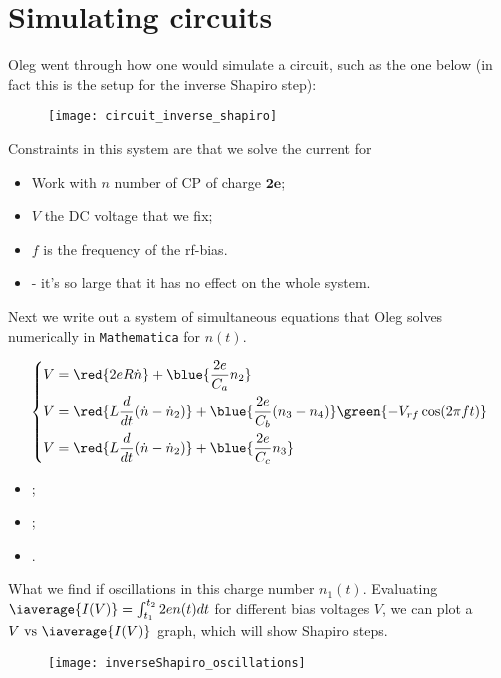 \newpage
\section{Simulating circuits \label{sec:simulating_circuits}}
Oleg went  through how one  would simulate a  circuit, such as  the one
below (in fact this is the setup for the inverse Shapiro step):

\begin{figure}[h]
  \centering \texttt{[image: circuit\_inverse\_shapiro]}
\end{figure}

\noindent

\noindent Constraints in this system are that we solve the current for
\begin{itemize}
\item Work with $ n $ \hfill number of CP of charge $ \mathbf{2e} $;
\item $ V $ \hfill the DC voltage that we fix;
\item $f$ \hfill is the frequency of the rf-bias.
\item {} - it's so large that it
  has no effect on the whole system.
\end{itemize}

\noindent Next  we write  out a system  of simultaneous  equations that
Oleg solves numerically in \verb|Mathematica| for $ n(t) $.

 \begin{equation}\label{key}
   \left\lbrace\begin{aligned}
       V & = \red{2eR\dot{n}} + \blue{\frac{2e}{C_a}n_2}\\
       V & = \red{L\frac{d}{dt}(\dot{n}-\dot{n}_2)} + \blue{\frac{2e}{C_b}(n_3 - n_4)}  \green{- V_{rf}\cos(2\pi ft)}\\
       V & = \red{L\frac{d}{dt}(\dot{n}-\dot{n}_2)} + \blue{\frac{2e}{C_c}n_3}
     \end{aligned}\right.
 \end{equation}
 \begin{itemize}
 \item  {};
 \item  {};
 \item {}.
 \end{itemize}

 \noindent  What  we  find  if   oscillations  in  this  charge  number
 $ n_1(t) $. Evaluating $ \iaverage{I(V)} = \int_{t_1}^{t_2}2e n(t)dt $
 for   different   bias    voltages   $   V   $,   we    can   plot   a
 $  V \text{  vs }  \iaverage{I(V)} $  graph, which  will show  Shapiro
 steps.

\begin{figure}[h]
  \centering \texttt{[image: inverseShapiro\_oscillations]}
\end{figure}

\newpage
